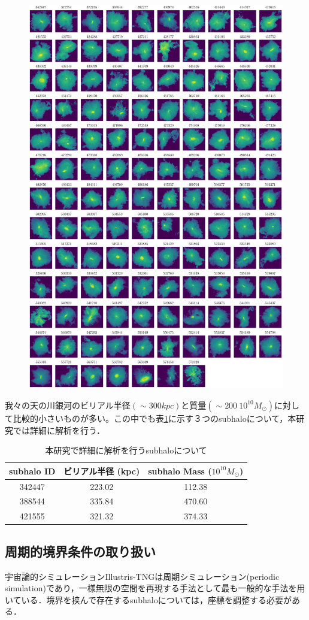 \begin{figure}[p]
	\centering
	\includegraphics[width=0.9\linewidth]{pic/eROSITAbubble_subhaloID}
	\caption{}
	\label{fig:erositabubblesubhaloid}
\end{figure}

我々の天の川銀河のビリアル半径$(\sim 300 \si{kpc})$と質量$(\sim 200 \ 10^{10} M_\odot)$に対して比較的小さいものが多い。この中でも表\ref{tab:subhalo_details}に示す３つのsubhaloについて，本研究では詳細に解析を行う．

\begin{table}[htbp]
	\centering
	\caption{本研究で詳細に解析を行うsubhaloについて}
	\label{tab:subhalo_details}
	\begin{tabular}{ccc}
		\toprule
		subhalo ID & ビリアル半径 (\si{kpc}) & subhalo Mass ($10^{10} M_\odot$)\\ \midrule
		342447     & 223.02       & 112.38       \\
		388544     & 335.84       & 470.60       \\
		421555     & 321.32       & 374.33       \\ \bottomrule
	\end{tabular}
\end{table}

\subsection{周期的境界条件の取り扱い}

宇宙論的シミュレーションIllustris-TNGは周期シミュレーション(periodic simulation)であり，一様無限の空間を再現する手法として最も一般的な手法を用いている．境界を挟んで存在するsubhaloについては，座標を調整する必要がある．



